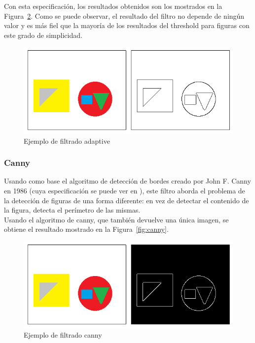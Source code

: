 {	Con esta especificación, los resultados obtenidos son los mostrados en la Figura~\ref{fig:adaptive}. Como se puede observar, el resultado del filtro no depende de ningún valor y es más fiel que la mayoría de los resultados del threshold para figuras con este grado de simplicidad.\\
	
		\begin{figure}[htbp]
		\centering
		\includegraphics[scale=0.47]{graphics/adaptive.png}
		\caption{Ejemplo de filtrado adaptive}
		\label{fig:adaptive}
		\end{figure}
	
	\subsubsection{Canny}
	
	Usando como base el algoritmo de detección de bordes creado por John F. Canny en 1986 (cuya especificación se puede ver en \cite{pajares}), este filtro aborda el problema de la detección de figuras de una forma diferente: en vez de detectar el contenido de la figura, detecta el perímetro de las mismas.\\
	
	Usando el algoritmo de canny, que también devuelve una única imagen, se obtiene el resultado mostrado en la Figura~\ref{fig:canny}.\\
	
		\begin{figure}[htbp]
		\centering
		\includegraphics[scale=0.47]{graphics/canny.png}
		\caption{Ejemplo de filtrado canny}
		\label{fig:adaptive}
		\end{figure}
		
}
